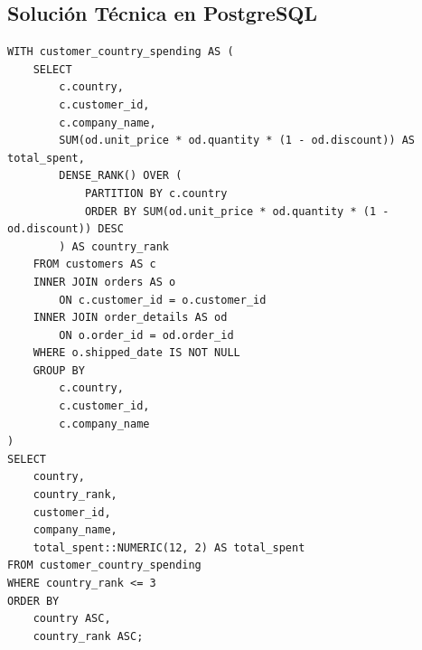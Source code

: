 \subsection{Soluci\'on T\'ecnica en PostgreSQL}

\begin{lstlisting}[style=sqlstyle, caption={Soluci\'on con CTE y partici\'on anal\'itica por pa\'is}]
WITH customer_country_spending AS (
    SELECT
        c.country,
        c.customer_id,
        c.company_name,
        SUM(od.unit_price * od.quantity * (1 - od.discount)) AS total_spent,
        DENSE_RANK() OVER (
            PARTITION BY c.country
            ORDER BY SUM(od.unit_price * od.quantity * (1 - od.discount)) DESC
        ) AS country_rank
    FROM customers AS c
    INNER JOIN orders AS o
        ON c.customer_id = o.customer_id
    INNER JOIN order_details AS od
        ON o.order_id = od.order_id
    WHERE o.shipped_date IS NOT NULL
    GROUP BY
        c.country,
        c.customer_id,
        c.company_name
)
SELECT
    country,
    country_rank,
    customer_id,
    company_name,
    total_spent::NUMERIC(12, 2) AS total_spent
FROM customer_country_spending
WHERE country_rank <= 3
ORDER BY
    country ASC,
    country_rank ASC;
\end{lstlisting}
